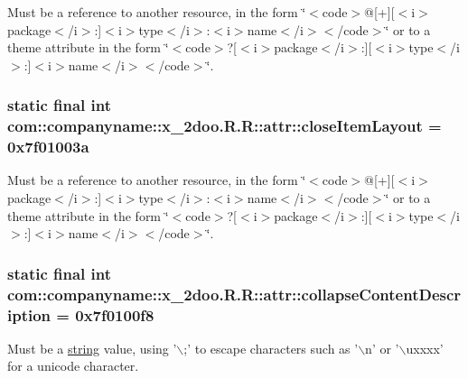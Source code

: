 Must be a reference to another resource, in the form \char`\"{}$<$code$>$@\mbox{[}+\mbox{]}\mbox{[}$<$i$>$package$<$/i$>$:\mbox{]}$<$i$>$type$<$/i$>$:$<$i$>$name$<$/i$>$$<$/code$>$\char`\"{} or to a theme attribute in the form \char`\"{}$<$code$>$?\mbox{[}$<$i$>$package$<$/i$>$:\mbox{]}\mbox{[}$<$i$>$type$<$/i$>$:\mbox{]}$<$i$>$name$<$/i$>$$<$/code$>$\char`\"{}. \hypertarget{classcom_1_1companyname_1_1x__2doo_1_1_r_1_1attr_19f2a0748ec8054e0227d67648e5bb64}{
\subsubsection[{closeItemLayout}]{\setlength{\rightskip}{0pt plus 5cm}static final int com::companyname::x\_\-2doo.R.R::attr::closeItemLayout = 0x7f01003a}}
\label{classcom_1_1companyname_1_1x__2doo_1_1_r_1_1attr_19f2a0748ec8054e0227d67648e5bb64}


Must be a reference to another resource, in the form \char`\"{}$<$code$>$@\mbox{[}+\mbox{]}\mbox{[}$<$i$>$package$<$/i$>$:\mbox{]}$<$i$>$type$<$/i$>$:$<$i$>$name$<$/i$>$$<$/code$>$\char`\"{} or to a theme attribute in the form \char`\"{}$<$code$>$?\mbox{[}$<$i$>$package$<$/i$>$:\mbox{]}\mbox{[}$<$i$>$type$<$/i$>$:\mbox{]}$<$i$>$name$<$/i$>$$<$/code$>$\char`\"{}. \hypertarget{classcom_1_1companyname_1_1x__2doo_1_1_r_1_1attr_1e672a257f5b406cbfc4774d38a8e4fd}{
\subsubsection[{collapseContentDescription}]{\setlength{\rightskip}{0pt plus 5cm}static final int com::companyname::x\_\-2doo.R.R::attr::collapseContentDescription = 0x7f0100f8}}
\label{classcom_1_1companyname_1_1x__2doo_1_1_r_1_1attr_1e672a257f5b406cbfc4774d38a8e4fd}


Must be a \hyperlink{classcom_1_1companyname_1_1x__2doo_1_1_r_1_1string}{string} value, using '$\backslash$;' to escape characters such as '$\backslash$n' or '$\backslash$uxxxx' for a unicode character. 

